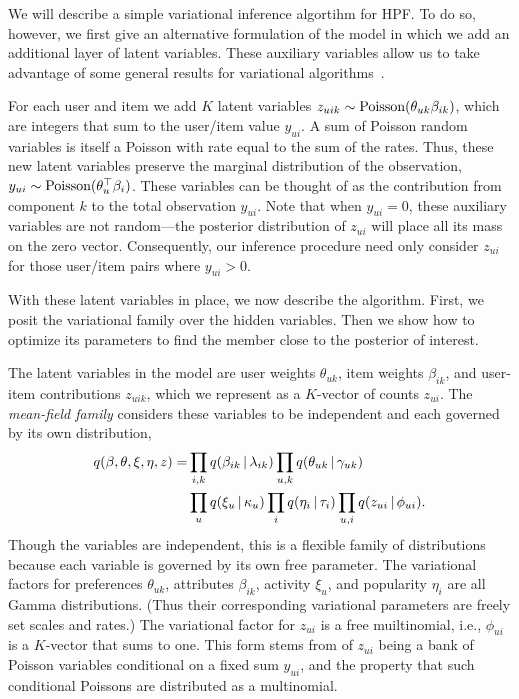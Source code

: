 
We will describe a simple variational inference algortihm for HPF.  To
do so, however, we first give an alternative formulation of the model
in which we add an additional layer of latent variables.  These
auxiliary variables allow us to take advantage of some general results
for variational algorithms~\cite{Ghahramani:2001,Hoffman:2013}.

For each user and item we add $K$ latent variables $z_{uik} \sim
\textrm{Poisson}(\theta_{uk} \beta_{ik})$, which are integers that sum to the
user/item value $y_{ui}$.  A sum of Poisson random variables is itself
a Poisson with rate equal to the sum of the rates.  Thus, these new
latent variables preserve the marginal distribution of the
observation, $y_{ui} \sim \textrm{Poisson}(\theta_{u}^\top \beta_{i})$.  These
variables can be thought of as the contribution from component $k$ to
the total observation $y_{ui}$.  Note that when $y_{ui} = 0$, these
auxiliary variables are not random---the posterior distribution of
$z_{ui}$ will place all its mass on the zero vector.  Consequently,
our inference procedure need only consider $z_{ui}$ for those
user/item pairs where $y_{ui} > 0$.

With these latent variables in place, we now describe the algorithm.
First, we posit the variational family over the hidden variables.
Then we show how to optimize its parameters to find the member close
to the posterior of interest.

The latent variables in the model are user weights $\theta_{uk}$, item
weights $\beta_{ik}$, and user-item contributions $z_{uik}$, which we
represent as a $K$-vector of counts $z_{ui}$.  The \textit{mean-field
  family} considers these variables to be independent and each
governed by its own distribution,
\begin{align}
  \label{eq:q}
  q(\beta, \theta, \xi, \eta, z) =& \prod_{i,k} q(\beta_{ik} \,\vert\, \lambda_{ik})
  \prod_{u,k} q(\theta_{uk} \,\vert\, \gamma_{uk}) \nonumber\\
  & \prod_{u} q(\xi_u \,\vert\, \kappa_u) \prod_{i} q(\eta_i \,\vert\, \tau_i)
  \prod_{u,i} q(z_{ui} \,\vert\, \phi_{ui}).
\end{align}
Though the variables are independent, this is a flexible family of
distributions because each variable is governed by its own free
parameter.  The variational factors for preferences $\theta_{uk}$,
attributes $\beta_{ik}$, activity $\xi_u$, and popularity $\eta_i$ are
all Gamma distributions.  (Thus their corresponding variational
parameters are freely set scales and rates.)  The variational factor
for $z_{ui}$ is a free muiltinomial, i.e., $\phi_{ui}$ is a $K$-vector
that sums to one.  This form stems from of $z_{ui}$ being a bank of
Poisson variables conditional on a fixed sum $y_{ui}$, and the
property that such conditional Poissons are distributed as a
multinomial.

